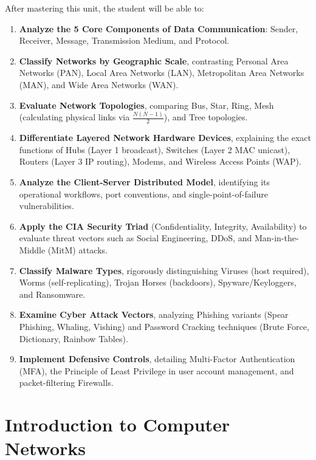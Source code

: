 \begin{important}
After mastering this unit, the student will be able to:
\begin{enumerate}[leftmargin=1.5em]
    \item \textbf{Analyze the 5 Core Components of Data Communication}: Sender, Receiver, Message, Transmission Medium, and Protocol.
    \item \textbf{Classify Networks by Geographic Scale}, contrasting Personal Area Networks (PAN), Local Area Networks (LAN), Metropolitan Area Networks (MAN), and Wide Area Networks (WAN).
    \item \textbf{Evaluate Network Topologies}, comparing Bus, Star, Ring, Mesh (calculating physical links via $\frac{N(N-1)}{2}$), and Tree topologies.
    \item \textbf{Differentiate Layered Network Hardware Devices}, explaining the exact functions of Hubs (Layer 1 broadcast), Switches (Layer 2 MAC unicast), Routers (Layer 3 IP routing), Modems, and Wireless Access Points (WAP).
    \item \textbf{Analyze the Client-Server Distributed Model}, identifying its operational workflows, port conventions, and single-point-of-failure vulnerabilities.
    \item \textbf{Apply the CIA Security Triad} (Confidentiality, Integrity, Availability) to evaluate threat vectors such as Social Engineering, DDoS, and Man-in-the-Middle (MitM) attacks.
    \item \textbf{Classify Malware Types}, rigorously distinguishing Viruses (host required), Worms (self-replicating), Trojan Horses (backdoors), Spyware/Keyloggers, and Ransomware.
    \item \textbf{Examine Cyber Attack Vectors}, analyzing Phishing variants (Spear Phishing, Whaling, Vishing) and Password Cracking techniques (Brute Force, Dictionary, Rainbow Tables).
    \item \textbf{Implement Defensive Controls}, detailing Multi-Factor Authentication (MFA), the Principle of Least Privilege in user account management, and packet-filtering Firewalls.
\end{enumerate}
\end{important}

\section{Introduction to Computer Networks}

